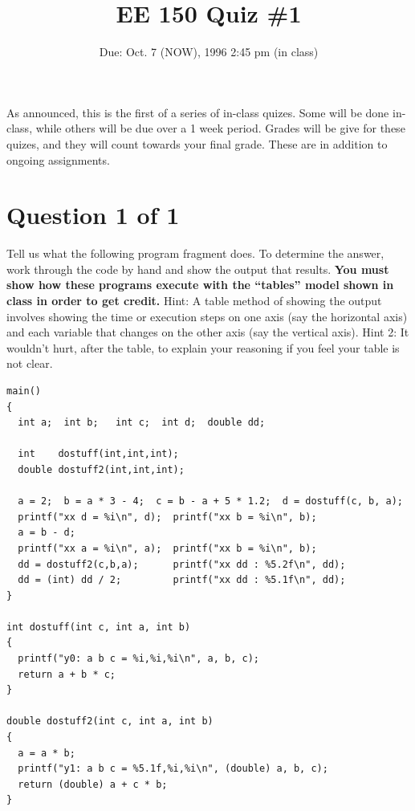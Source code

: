 \setcounter{page}{1}



\title{EE 150 Quiz \#1}
\author{Due: Oct. 7 (NOW), 1996 2:45 pm (in class)}
\date{}
\maketitle

As announced, this is the first of a series of in-class quizes. Some
will be done in-class, while others will be due over a 1 week period.
Grades will be give for these quizes, and they will count towards your
final grade.  These are in addition to ongoing assignments. 

\section*{Question 1 of 1}

Tell us what the following program fragment does.  To determine
the answer, work through the code by hand and show the output that
results.  {\bf You must show how these programs execute with the
``tables'' model shown in class  in order to get credit.} Hint:  A
table method of showing the output involves showing the time or
execution steps on one axis (say the horizontal axis) and each
variable that changes on the other axis (say the vertical axis).  Hint
2: It wouldn't hurt, after the table, to explain your reasoning if you
feel your table is 
not clear.

\begin{verbatim}
main()
{
  int a;  int b;   int c;  int d;  double dd;

  int    dostuff(int,int,int);
  double dostuff2(int,int,int);

  a = 2;  b = a * 3 - 4;  c = b - a + 5 * 1.2;  d = dostuff(c, b, a);
  printf("xx d = %i\n", d);  printf("xx b = %i\n", b);
  a = b - d;
  printf("xx a = %i\n", a);  printf("xx b = %i\n", b);
  dd = dostuff2(c,b,a);      printf("xx dd : %5.2f\n", dd);
  dd = (int) dd / 2;         printf("xx dd : %5.1f\n", dd);
}

int dostuff(int c, int a, int b)
{
  printf("y0: a b c = %i,%i,%i\n", a, b, c);
  return a + b * c;
}

double dostuff2(int c, int a, int b)
{
  a = a * b;
  printf("y1: a b c = %5.1f,%i,%i\n", (double) a, b, c);
  return (double) a + c * b;
}
\end{verbatim}


